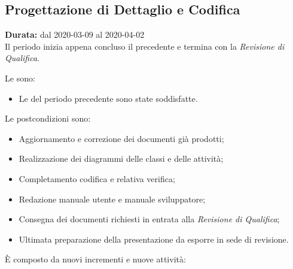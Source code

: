 \subsection{Progettazione di Dettaglio e Codifica}
\label{progettazione_di_dettaglio}
\textbf{Durata:} dal 2020-03-09 al 2020-04-02 \\
Il periodo inizia appena concluso il precedente e termina con la \textit{Revisione di Qualifica}. 

Le  sono:
\begin{itemize}
    \item Le  del periodo precedente sono state soddisfatte.
\end{itemize}

Le postcondizioni sono:
\begin{itemize}
    \item Aggiornamento e correzione dei documenti già prodotti;
    \item Realizzazione dei diagrammi delle classi e delle attività;
    \item Completamento codifica e relativa verifica;
    \item Redazione manuale utente e manuale sviluppatore;
    \item Consegna dei documenti richiesti in entrata alla \textit{Revisione di Qualifica};
    \item Ultimata preparazione della presentazione da esporre in sede di revisione.
\end{itemize}
È composto da nuovi incrementi e nuove attività:

